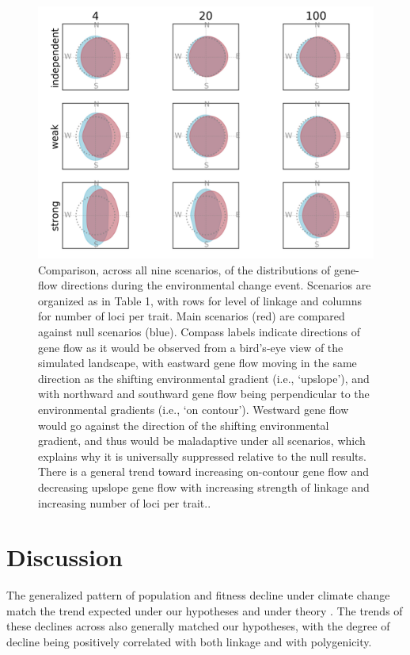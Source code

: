 \documentclass[9pt,twocolumn,twoside,lineno]{pnas-new}
\begin{document}
\begin{figure}
\centering
\includegraphics[width=17.8cm]{gene_flow.jpg}
\caption{Comparison, across all nine scenarios, of the distributions of gene-flow directions during the environmental change event. Scenarios are organized as in Table 1, with rows for level of linkage and columns for number of loci per trait. Main scenarios (red) are compared against null scenarios (blue). Compass labels indicate directions of gene flow as it would be observed from a bird’s-eye view of the simulated landscape, with eastward gene flow moving in the same direction as the shifting environmental gradient (i.e., ‘upslope’), and with northward and southward gene flow being perpendicular to the environmental gradients (i.e., ‘on contour’). Westward gene flow would go against the direction of the shifting environmental gradient, and thus would be maladaptive under all scenarios, which explains why it is universally suppressed relative to the null results. There is a general trend toward increasing on-contour gene flow and decreasing upslope gene flow with increasing strength of linkage and increasing number of loci per trait..
}
\label{fig:gene_flow}
\end{figure}


\section*{Discussion}

The generalized pattern of population and fitness decline under 
climate change match the
trend expected under our hypotheses and under theory 
\cite{aitken_whitlock}.
The trends of these declines across also generally matched our hypotheses,
with the degree of decline being positively correlated with both linkage and with polygenicity.
\end{document}
